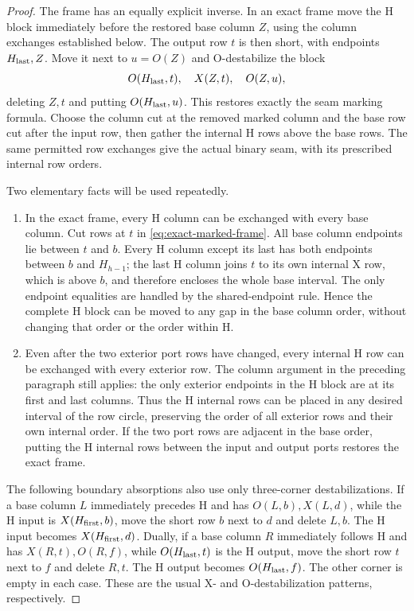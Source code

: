 \documentclass[11pt,a4paper]{article}
\theoremstyle{remark}
\begin{document}
\begin{proof}
The frame has an equally explicit inverse.  In an exact frame move the
H block immediately before the restored base column $Z$, using the
column exchanges established below.  The output row $t$ is then short,
with endpoints $H_{\rm last},Z$.  Move it next to $u=O(Z)$ and
O-destabilize the block
\[
 O(H_{\rm last},t),\quad X(Z,t),\quad O(Z,u),
\]
deleting $Z,t$ and putting $O(H_{\rm last},u)$.  This restores exactly
the seam marking formula.  Choose the column cut at the removed marked
column and the base row cut after the input row, then gather the
internal H rows above the base rows.  The same permitted row exchanges
give the actual binary seam, with its prescribed internal row orders.

Two elementary facts will be used repeatedly.
\begin{enumerate}
\item In the exact frame, every H column can be exchanged with every
base column.  Cut rows at $t$ in \eqref{eq:exact-marked-frame}.  All base
column endpoints lie between $t$ and $b$.  Every H column except its
last has both endpoints between $b$ and $H_{h-1}$; the last H column
joins $t$ to its own internal X row, which is above $b$, and therefore
encloses the whole base interval.  The only
endpoint equalities are handled by the shared-endpoint rule.  Hence
the complete H block can be moved to any gap in the base column order,
without changing that order or the order within H.
\item Even after the two exterior port rows have changed, every
internal H row can be exchanged with every exterior row.  The column
argument in the preceding paragraph still applies: the only exterior
endpoints in the H block are at its first and last columns.  Thus the
H internal rows can be placed in any desired interval of the row
circle, preserving the order of all exterior rows and their own
internal order.  If the two port rows are adjacent in the base order,
putting the H internal rows between the input and output ports restores
the exact frame.
\end{enumerate}

The following boundary absorptions also use only three-corner
destabilizations.  If a base column $L$ immediately precedes H and has
$O(L,b),X(L,d)$, while the H input is $X(H_{\rm first},b)$, move the
short row $b$ next to $d$ and delete $L,b$.  The H input becomes
$X(H_{\rm first},d)$.  Dually, if a base column $R$ immediately follows
H and has $X(R,t),O(R,f)$, while $O(H_{\rm last},t)$ is the H output,
move the short row $t$ next to $f$ and delete $R,t$.  The H output
becomes $O(H_{\rm last},f)$.  The other corner is empty in each case.
These are the usual X- and O-destabilization patterns, respectively.


\end{proof}
\end{document}
